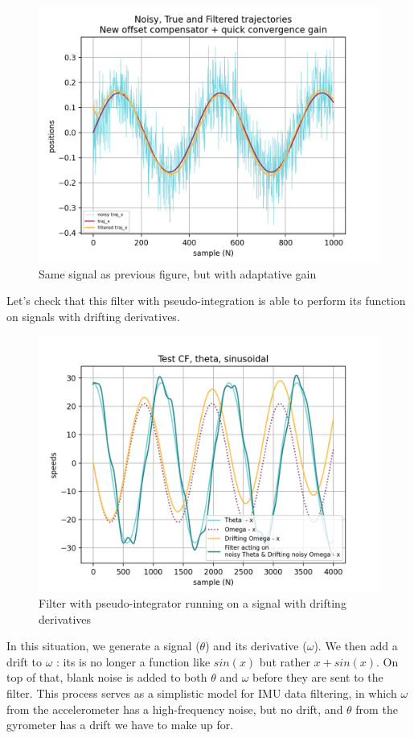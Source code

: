 \documentclass[a4paper,10pt]{article}
\begin{document}
\begin{figure}[H]
\centering
  \includegraphics[width=\linewidth, angle=0, scale=0.8]{./images/CF_test_sinus_3_QuickConvGain.png}
  \caption{Same signal as previous figure, but with adaptative gain}
\end{figure}

Let's check that this filter with pseudo-integration is able to perform its function on signals with drifting derivatives.

\begin{figure}[H]
\centering
  \includegraphics[width=\linewidth, angle=0, scale=0.8]{./images/CF_Drifting_Signal.png}
  \caption{Filter with pseudo-integrator running on a signal with drifting derivatives}
\end{figure}
In this situation, we generate a signal ($\theta$) and its derivative ($\omega$). We then add a drift to $\omega$ : its is no longer a function like $sin(x)$ but rather $x + sin(x)$. On top of that, blank noise is added to both $\theta$ and $\omega$ before they are sent to the filter. This process serves as a simplistic model for IMU data filtering, in which $\omega$ from the accelerometer has a high-frequency noise, but no drift, and $\theta$ from the gyrometer has a drift we have to make up for.
\end{document}
